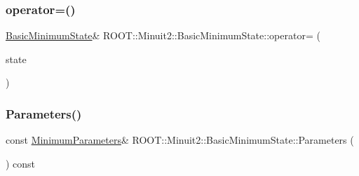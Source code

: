 \mbox{\label{classROOT_1_1Minuit2_1_1BasicMinimumState_a68cf1c28f5f728fa62a0c39ff943a2bf}} 
\subsubsection{\texorpdfstring{operator=()}{operator=()}\hspace{0.1cm}{\footnotesize\ttfamily [3/3]}}
{\footnotesize\ttfamily \mbox{\hyperlink{classROOT_1_1Minuit2_1_1BasicMinimumState}{Basic\+Minimum\+State}}\& R\+O\+O\+T\+::\+Minuit2\+::\+Basic\+Minimum\+State\+::operator= (\begin{DoxyParamCaption}\item[{const \mbox{\hyperlink{classROOT_1_1Minuit2_1_1BasicMinimumState}{Basic\+Minimum\+State}} \&}]{state }\end{DoxyParamCaption})\hspace{0.3cm}{\ttfamily [inline]}}

\mbox{\label{classROOT_1_1Minuit2_1_1BasicMinimumState_a0b72fce84557374c989a6581711e6e6a}} 
\subsubsection{\texorpdfstring{Parameters()}{Parameters()}\hspace{0.1cm}{\footnotesize\ttfamily [1/3]}}
{\footnotesize\ttfamily const \mbox{\hyperlink{classROOT_1_1Minuit2_1_1MinimumParameters}{Minimum\+Parameters}}\& R\+O\+O\+T\+::\+Minuit2\+::\+Basic\+Minimum\+State\+::\+Parameters (\begin{DoxyParamCaption}{ }\end{DoxyParamCaption}) const\hspace{0.3cm}{\ttfamily [inline]}}

